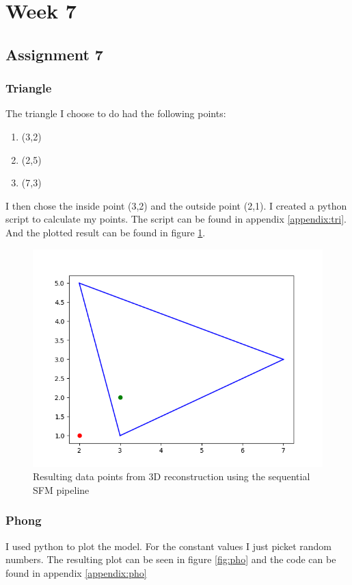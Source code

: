 \documentclass{article}
\begin{document}
\section{Week 7}
\subsection{Assignment 7}
\subsubsection{Triangle}
The triangle I choose to do had the following points:
\begin{enumerate}
    \item (3,2)
    \item (2,5)
    \item (7,3)
\end{enumerate}
I then chose the inside point (3,2) and the outside point (2,1). I created a python script to calculate my points. The script can be found in appendix \ref{appendix:tri}. And the plotted result can be found in figure \ref{fig:tri}.

\begin{figure}[H]
    \centering
    \includegraphics[width=1\textwidth]{tri.png} 
    \caption{Resulting data points from 3D reconstruction using the sequential SFM pipeline}
    \label{fig:tri}
\end{figure}

\subsubsection{Phong}
I used python to plot the model. For the constant values I just picket random numbers. The resulting plot can be seen in figure \ref{fig:pho} and the code can be found in appendix \ref{appendix:pho}
\end{document}
